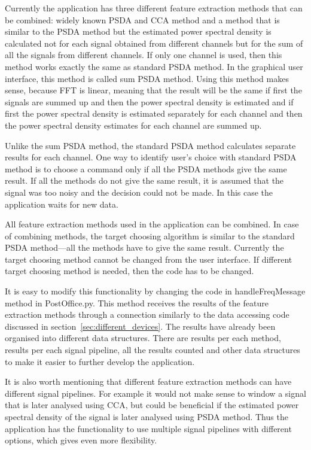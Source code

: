 Currently the application has three different \gls{feature extraction} methods that can be combined: widely known \gls{PSDA} and \gls{CCA} method and a method that is similar to the \gls{PSDA} method but the estimated \gls{power spectral density} is calculated not for each signal obtained from different channels but for the sum of all the signals from different channels. If only one channel is used, then this method works exactly the same as standard \gls{PSDA} method. In the graphical user interface, this method is called sum \gls{PSDA} method. Using this method makes sense, because \gls{FFT} is linear, meaning that the result will be the same if first the signals are summed up and then the \gls{power spectral density} is estimated and if first the \gls{power spectral density} is estimated separately for each channel and then the \gls{power spectral density} estimates for each channel are summed up.

Unlike the sum \gls{PSDA} method, the standard \gls{PSDA} method calculates separate results for each channel. One way to identify user's choice with standard \gls{PSDA} method is to choose a command only if all the \gls{PSDA} methods give the same result. If all the methods do not give the same result, it is assumed that the signal was too noisy and the decision could not be made. In this case the application waits for new data.

All \gls{feature extraction} methods used in the application can be combined. In case of combining methods, the \gls{target} choosing algorithm is similar to the standard \gls{PSDA} method---all the methods have to give the same result. Currently the \gls{target} choosing method cannot be changed from the user interface. If different \gls{target} choosing method is needed, then the code has to be changed.

It is easy to modify this functionality by changing the code in handleFreqMessage method in PostOffice.py. This method receives the results of the \gls{feature extraction} methods through a connection similarly to the data accessing code discussed in section~\ref{sec:different_devices}. The results have already been organised into different data structures. There are results per each method, results per each signal pipeline, all the results counted and other data structures to make it easier to further develop the application.

It is also worth mentioning that different \gls{feature extraction} methods can have different signal pipelines. For example it would not make sense to \gls{window} a signal that is later analysed using \gls{CCA}, but  could be beneficial if the estimated \gls{power spectral density} of the signal is later analysed using \gls{PSDA} method. Thus the application has the functionality to use multiple signal pipelines with different options, which gives even more flexibility.

